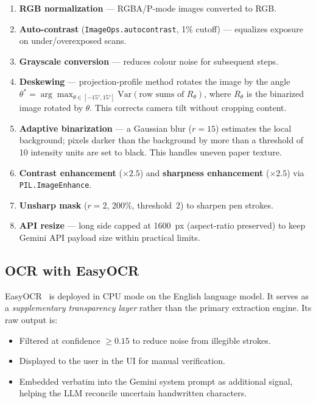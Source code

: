 \documentclass[12pt,a4paper]{article}
\begin{document}
\begin{enumerate}[noitemsep]
    \item \textbf{RGB normalization} — RGBA/P-mode images converted to RGB.
    \item \textbf{Auto-contrast} (\texttt{ImageOps.autocontrast}, 1\% cutoff) — equalizes
          exposure on under/overexposed scans.
    \item \textbf{Grayscale conversion} — reduces colour noise for subsequent steps.
    \item \textbf{Deskewing} — projection-profile method rotates the image by the angle
          $\theta^* = \arg\max_{\theta \in [-15°, 15°]} \mathrm{Var}(\text{row sums of } R_\theta)$,
          where $R_\theta$ is the binarized image rotated by $\theta$. This
          corrects camera tilt without cropping content.
    \item \textbf{Adaptive binarization} — a Gaussian blur ($r=15$) estimates the local
          background; pixels darker than the background by more than a threshold
          of 10 intensity units are set to black. This handles uneven paper texture.
    \item \textbf{Contrast enhancement} ($\times 2.5$) and \textbf{sharpness enhancement}
          ($\times 2.5$) via \texttt{PIL.ImageEnhance}.
    \item \textbf{Unsharp mask} ($r=2$, 200\%, threshold~2) to sharpen pen strokes.
    \item \textbf{API resize} — long side capped at 1600~px (aspect-ratio preserved)
          to keep Gemini API payload size within practical limits.
\end{enumerate}

\subsection{OCR with EasyOCR}

EasyOCR~\cite{easyocr} is deployed in CPU mode on the English language model.
It serves as a \emph{supplementary transparency layer} rather than the primary
extraction engine. Its raw output is:

\begin{itemize}[noitemsep]
    \item Filtered at confidence $\geq 0.15$ to reduce noise from illegible strokes.
    \item Displayed to the user in the UI for manual verification.
    \item Embedded verbatim into the Gemini system prompt as additional signal,
          helping the LLM reconcile uncertain handwritten characters.
\end{itemize}
\end{document}
